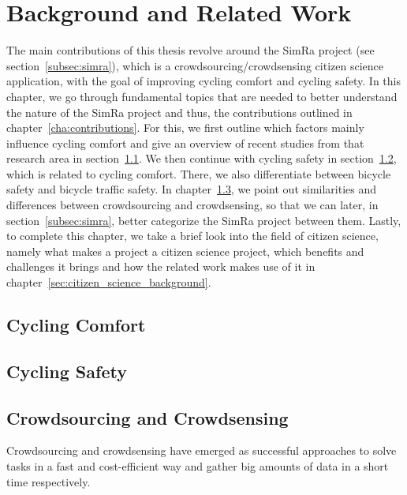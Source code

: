 \cleardoublepage
\chapter{Background and Related Work}
\label{cha:background}
The main contributions of this thesis revolve around the SimRa project (see section~\ref{subsec:simra}), which is a crowdsourcing/crowdsensing citizen science application, with the goal of improving cycling comfort and cycling safety.
In this chapter, we go through fundamental topics that are needed to better understand the nature of the SimRa project and thus, the contributions outlined in chapter~\ref{cha:contributions}.
For this, we first outline which factors mainly influence cycling comfort and give an overview of recent studies from that research area in section~\ref{sec:cycling_comfort_background}.
We then continue with cycling safety in section~\ref{sec:cycling_safety_background}, which is related to cycling comfort.
There, we also differentiate between bicycle safety and bicycle traffic safety.
In chapter~\ref{sec:crowdsourcing_crowdsensing_background}, we point out similarities and differences between crowdsourcing and crowdsensing, so that we can later, in section~\ref{subsec:simra}, better categorize the SimRa project between them.
Lastly, to complete this chapter, we take a brief look into the field of citizen science, namely what makes a project a citizen science project, which benefits and challenges it brings and how the related work makes use of it in chapter~\ref{sec:citizen_science_background}. 

\section{Cycling Comfort}
\label{sec:cycling_comfort_background}

\section{Cycling Safety}
\label{sec:cycling_safety_background}

\section{Crowdsourcing and Crowdsensing}
\label{sec:crowdsourcing_crowdsensing_background}
Crowdsourcing and crowdsensing have emerged as successful approaches to solve tasks in a fast and cost-efficient way and gather big amounts of data in a short time respectively.

